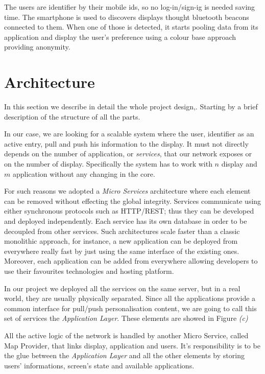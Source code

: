\documentclass[]{usiinfbachelorproject}
\begin{document}
The users are identifier by their mobile ids, so no log-in/sign-ig is needed saving time. The smartphone is used to discovers displays thought bluetooth beacons connected to them. When one of those is detected, it starts pooling data from its application and display the user's preference using a colour base approach providing anonymity. 

\section{Architecture}
In this section we describe in detail the whole project design,. Starting by a brief description of the structure of all the parts.

In our case, we are looking for a scalable system where the user, identifier as an active entry, pull and push his information to the display. It must not directly depends on the number of application, or \emph{services}, that our network exposes or on the number of display. Specifically the system has to work with $n$ display and $m$ application without any changing in the core. 

For such reasons we adopted a \emph{Micro Services} architecture where each element can be removed without effecting the global integrity. Services communicate using either synchronous protocols such as HTTP/REST; thus they can be developed and deployed independently. Each service has its own database in order to be decoupled from other services. Such architectures scale faster than a classic monolithic approach, for instance, a new application can be deployed from everywhere really fast by just using the same interface of the existing ones. Moreover, each application can be added from everywhere allowing developers to use their favourites technologies and hosting platform.


In our project we deployed all the services on the same server, but in a real world, they are usually physically separated. Since all the applications provide a common interface for pull/push personalisation content, we are going to call this set of services the \emph{Application Layer}. These elements are showed in Figure \emph{(c)}


All the active logic of the network is handled by another Micro Service, called Map Provider, that links display, application and users. It's responsibility is to be the glue between the \emph{Application Layer} and all the other elements by storing users' informations, screen's state and available applications.
\\
\end{document}

